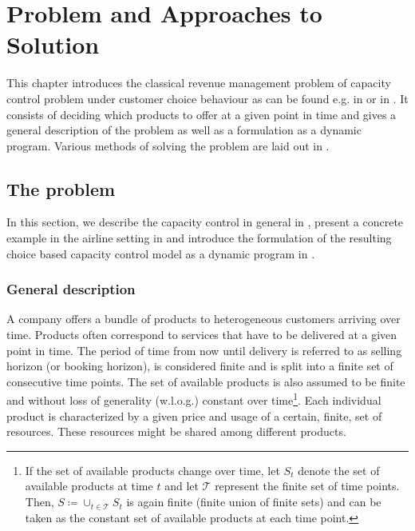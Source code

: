 
\chapter{Problem and Approaches to Solution}\label{ch:ProblemsMethods}

This chapter introduces the classical revenue management problem of capacity control problem under customer choice behaviour as can be found e.g. in \cite{Koch.2017} or in \cite{Strauss.2018}. It consists of deciding which products to offer at a given point in time and  gives a general description of the problem as well as a formulation as a dynamic program. Various methods of solving the problem are laid out in .

\section{The problem}\label{s:Prob}

In this section, we describe the capacity control in general in , present a concrete example in the airline setting in  and introduce the formulation of the resulting choice based capacity control model as a dynamic program in . 

\subsection{General description}\label{ss:Prob:GenDesc}

A company offers a bundle of products to heterogeneous customers arriving over time. Products often correspond to services that have to be delivered at a given point in time. The period of time from now until delivery is referred to as selling horizon (or booking horizon), is considered finite and is split into a finite set of consecutive time points. The set of available products is also assumed to be finite and without loss of generality (w.l.o.g.) constant over time\footnote{If the set of available products change over time, let $S_t$ denote the set of available products at time $t$ and let $\mathcal{T}$ represent the finite set of time points. Then, $S \coloneq \cup_{t \in \mathcal{T}}S_t$ is again finite (finite union of finite sets) and can be taken as the constant set of available products at each time point.}. Each individual product is characterized by a given price and usage of a certain, finite, set of resources. These resources might be shared among different products. 

